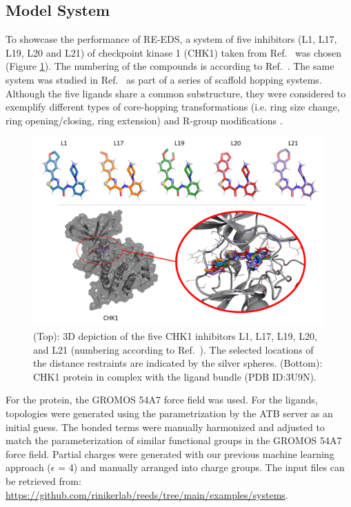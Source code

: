 \subsection{Model System}
\label{ch:3Methods}
To showcase the performance of RE-EDS, a system of five inhibitors (L1, L17, L19, L20 and L21) of checkpoint kinase 1 (CHK1) taken from Ref.~ was chosen (Figure \ref{fig:Ligands/Protein}). The numbering of the compounds is according to Ref.~. The same system was studied in Ref.~ as part of a series of scaffold hopping systems. Although the five ligands share a common substructure, they were considered to exemplify different types of core-hopping transformations (i.e. ring size change, ring opening/closing, ring extension) and R-group modifications \cite{Wang2017}.

\begin{figure}[h]
    \centering
    \includegraphics[width=\columnwidth]{fig/methods/CHK1_ring_opening_system_condense.png}
    \caption{(Top): 3D depiction of the five CHK1 inhibitors L1, L17, L19, L20, and L21 (numbering according to Ref.~). The selected locations of the distance restraints are indicated by the silver spheres. (Bottom): CHK1 protein in complex with the ligand bundle (PDB ID:3U9N).}
    \label{fig:Ligands/Protein}
\end{figure}

For the protein, the GROMOS 54A7 force field \cite{Schmid2011} was used. For the ligands, topologies were generated using the parametrization by the ATB server \cite{Mark2011} as an initial guess. The bonded terms were manually harmonized and adjusted to match the parameterization of similar functional groups in the GROMOS 54A7 force field. Partial charges were generated with our previous machine learning approach \cite{Bleiziffer2018} ($\epsilon$ = 4) and manually arranged into charge groups. The input files can be retrieved from: \url{https://github.com/rinikerlab/reeds/tree/main/examples/systems}.

